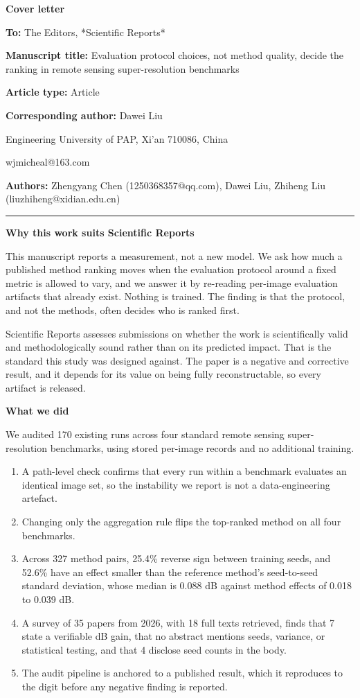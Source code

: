 \documentclass[11pt]{article}
\begin{document}
\begin{center}{\large\bfseries Cover letter}\end{center}

\textbf{To:} The Editors, *Scientific Reports*

\textbf{Manuscript title:} Evaluation protocol choices, not method quality, decide the ranking in remote sensing super-resolution benchmarks

\textbf{Article type:} Article

\textbf{Corresponding author:} Dawei Liu

Engineering University of PAP, Xi'an 710086, China

wjmicheal@163.com

\textbf{Authors:} Zhengyang Chen (1250368357@qq.com), Dawei Liu, Zhiheng Liu (liuzhiheng@xidian.edu.cn)

\medskip\hrule\medskip

\medskip\noindent\textbf{Why this work suits Scientific Reports}

This manuscript reports a measurement, not a new model. We ask how much a published method ranking moves when the evaluation protocol around a fixed metric is allowed to vary, and we answer it by re-reading per-image evaluation artifacts that already exist. Nothing is trained. The finding is that the protocol, and not the methods, often decides who is ranked first.

Scientific Reports assesses submissions on whether the work is scientifically valid and methodologically sound rather than on its predicted impact. That is the standard this study was designed against. The paper is a negative and corrective result, and it depends for its value on being fully reconstructable, so every artifact is released.

\medskip\noindent\textbf{What we did}

We audited 170 existing runs across four standard remote sensing super-resolution benchmarks, using stored per-image records and no additional training.

\begin{enumerate}
\item A path-level check confirms that every run within a benchmark evaluates an identical image set, so the instability we report is not a data-engineering artefact.
\item Changing only the aggregation rule flips the top-ranked method on all four benchmarks.
\item Across 327 method pairs, 25.4\% reverse sign between training seeds, and 52.6\% have an effect smaller than the reference method's seed-to-seed standard deviation, whose median is 0.088 dB against method effects of 0.018 to 0.039 dB.
\item A survey of 35 papers from 2026, with 18 full texts retrieved, finds that 7 state a verifiable dB gain, that no abstract mentions seeds, variance, or statistical testing, and that 4 disclose seed counts in the body.
\item The audit pipeline is anchored to a published result, which it reproduces to the digit before any negative finding is reported.
\end{enumerate}
\end{document}

